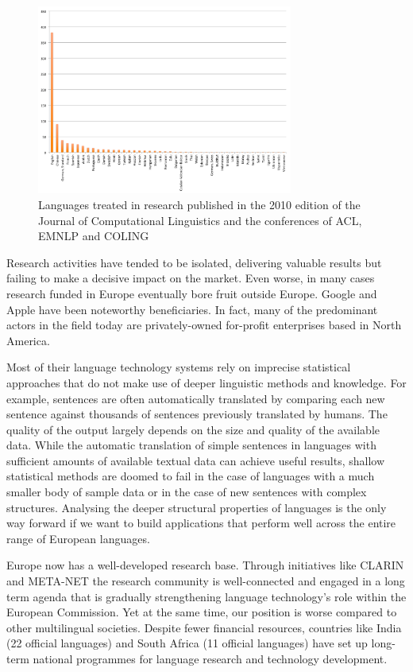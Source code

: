 \documentclass[10pt, plain]{../../metanetpaper}
\begin{document}
\begin{multicols}{2}
\begin{figure}[htb]
  \center
  \includegraphics[width=0.75\textwidth]{../_media/Languages-in-LT-Research}
  \caption{Languages treated in research published in the 2010 edition of the Journal of Computational Linguistics and the conferences of ACL, EMNLP and COLING}
  \label{fig:languages-in-research}
\end{figure}

Research activities have tended to be isolated, delivering valuable results but failing to make a decisive impact on the market. Even worse, in many cases research funded in Europe eventually bore fruit outside Europe. Google and Apple have been noteworthy beneficiaries. In fact, many of the predominant actors in the field today are privately-owned for-profit enterprises based in North America.

Most of their language technology systems rely on imprecise statistical approaches that do not make use of deeper linguistic methods and knowledge. For example, sentences are often automatically translated by comparing each new sentence against thousands of sentences previously translated by humans. The quality of the output largely depends on the size and quality of the available data. While the automatic translation of simple sentences in languages with sufficient amounts of available textual data can achieve useful results, shallow statistical methods are doomed to fail in the case of languages with a much smaller body of sample data or in the case of new sentences with complex structures. Analysing the deeper structural properties of languages is the only way forward if we want to build applications that perform well across the entire range of European languages.

Europe now has a well-developed research base. Through initiatives like CLARIN and META-NET the research community is well-connected and engaged in a long term agenda that is gradually strengthening language technology's role within the European Commission. Yet at the same time, our position is worse compared to other multilingual societies. Despite fewer financial resources, countries like India (22 official languages) and South Africa (11 official languages) have set up long-term national programmes for language research and technology development.


\end{multicols}
\end{document}

